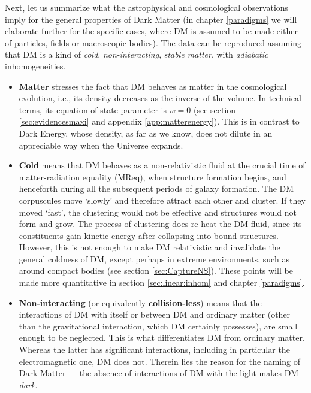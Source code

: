 \bigskip

Next, let us summarize what the astrophysical and cosmological observations imply for the general properties of Dark Matter (in chapter \ref{paradigms} we will elaborate further for the specific cases, where DM is assumed to be made either of particles, fields or macroscopic bodies).
The data can be reproduced assuming that DM is a kind of {\em cold}, {\em non-interacting}, {\em stable matter}, with {\em adiabatic} inhomogeneities. 
\begin{itemize}
\item[$\circ$] {\bf Matter} stresses the fact that DM behaves as matter in the cosmological evolution, i.e., its density decreases as the inverse of the volume. In technical terms, its equation of state parameter is $w=0$ (see section \ref{sec:evidencesmaxi} and appendix \ref{app:matterenergy}). This is in contrast to Dark Energy, whose density, as far as we know, does not dilute in an appreciable way when the Universe expands.

\item[$\circ$] 
{\bf Cold} means that DM behaves as a non-relativistic fluid at the crucial time of matter-radiation equality (MReq), when structure formation begins, and henceforth during all the subsequent periods of galaxy formation. The DM corpuscules move `slowly' and therefore attract each other and cluster. If they moved `fast', the clustering would not be effective and structures would not form and grow. The process of clustering does re-heat the DM fluid, since its constituents gain kinetic energy after collapsing into bound structures. However, this is not enough to make DM relativistic and invalidate the general coldness of DM, except perhaps in extreme environments, such as around compact bodies (see section \ref{sec:CaptureNS}). 
These points will be made more quantitative in section \ref{sec:linear:inhom} and chapter \ref{paradigms}.

\item[$\circ$] 
{\bf Non-interacting} (or equivalently {\bf collision-less}) means that the interactions of DM with itself or between DM and ordinary matter (other than the gravitational interaction, which DM certainly possesses), are small enough to be neglected. This is what differentiates DM from ordinary matter. Whereas the latter has significant interactions, including in particular the electromagnetic one, DM does not. 
Therein lies the reason for the naming of Dark Matter --- the absence of interactions of DM with the light makes DM {\em dark}. 


\end{itemize}
